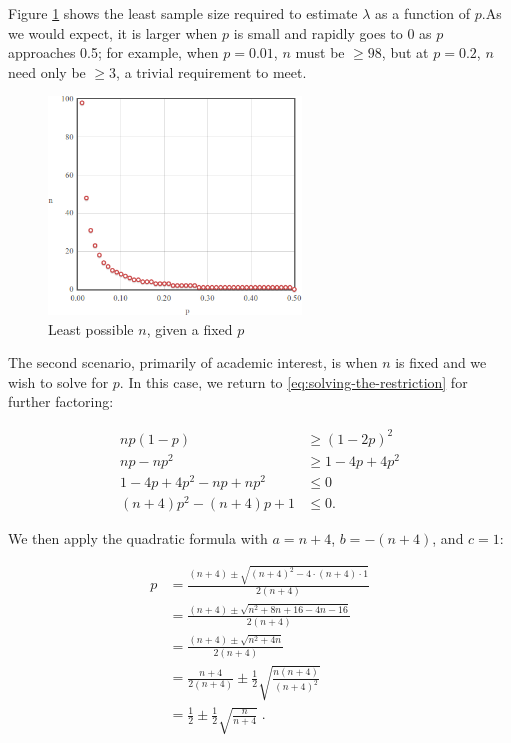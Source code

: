 \documentclass{article}
\begin{document}
Figure \ref{fig:sn-restriction-least-n} shows the least sample size required to
estimate $\lambda$ as a function of $p$.\footnotemark As we would expect, it is
larger when $p$ is small and rapidly goes to 0 as $p$ approaches 0.5; for
example, when $p = 0.01$, $n$ must be $\geq 98$, but at $p = 0.2$, $n$ need
only be $\geq 3$, a trivial requirement to meet.


\begin{figure}
  \centering
  \includegraphics[width=0.6\textwidth]{../images/restriction-least-n.png}
  \caption{Least possible $n$, given a fixed $p$}
  \label{fig:sn-restriction-least-n}
\end{figure}

The second scenario, primarily of academic interest, is when $n$ is fixed and
we wish to solve for $p$. In this case, we return to
\eqref{eq:solving-the-restriction} for further factoring:

\begin{align}
  np(1-p) &\geq (1-2p)^2 \nonumber \\
  np - np^2 &\geq 1 - 4p + 4p^2 \nonumber \\
  1 - 4p + 4p^2 - np + np^2 &\leq 0 \nonumber \\
  (n+4)p^2 - (n+4)p + 1 &\leq 0 \label{eq: solving for p}.
\end{align}

We then apply the quadratic formula with $a = n+4$, $b = -(n+4)$, and $c = 1$:

\begin{align*}
  p &= \frac{(n+4) \pm \sqrt{(n+4)^2 - 4 \cdot (n+4) \cdot 1}}{2(n+4)} \\
  &= \frac{(n+4) \pm \sqrt{n^2 + 8n + 16 - 4n - 16}}{2(n+4)} \\
  &= \frac{(n+4) \pm \sqrt{n^2 + 4n}}{2(n+4)} \\
  &= \frac{n+4}{2(n+4)} \pm \frac12 \sqrt{\frac{n(n+4)}{(n+4)^2}} \\
  &= \frac12 \pm \frac12 \sqrt{\frac{n}{n+4}} \;.
\end{align*}
\end{document}
